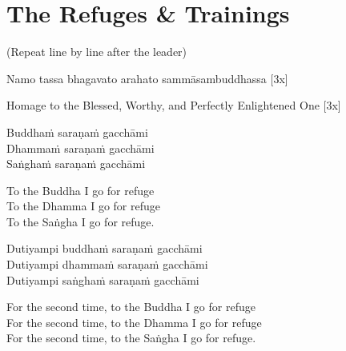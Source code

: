 \section{The Refuges \& Trainings}



\begin{center}
  (Repeat line by line after the leader)\\
\end{center}

Namo tassa bhagavato arahato sammāsambuddhassa \hfill{[3x]}\\

\begin{english}
  Homage to the Blessed, Worthy, and Perfectly Enlightened One \hfill{[3x]}\\
\end{english}

Buddhaṁ saraṇaṁ gacchāmi\\
Dhammaṁ saraṇaṁ gacchāmi\\
Saṅghaṁ saraṇaṁ gacchāmi\\

\begin{english}
  To the Buddha I go for refuge\\
  To the Dhamma I go for refuge\\
  To the Saṅgha I go for refuge.\\
\end{english}

Dutiyampi buddhaṁ saraṇaṁ gacchāmi\\
Dutiyampi dhammaṁ saraṇaṁ gacchāmi\\
Dutiyampi saṅghaṁ saraṇaṁ gacchāmi\\

\begin{english}
  For the second time, to the Buddha I go for refuge\\
  For the second time, to the Dhamma I go for refuge\\
  For the second time, to the Saṅgha I go for refuge.\\
\end{english}

